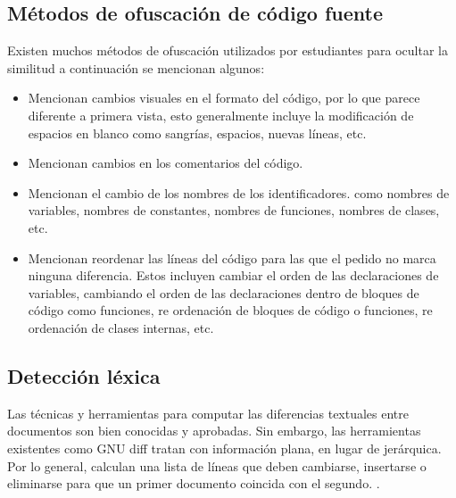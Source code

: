 \subsection{Métodos de ofuscación de código fuente}
Existen muchos métodos de ofuscación utilizados por estudiantes para ocultar la similitud a continuación se mencionan algunos:
\begin{itemize}
    \item \cite{article3} Mencionan cambios visuales en el formato del código, por lo que parece diferente a primera vista, esto generalmente incluye la modificación de espacios en blanco como sangrías, espacios, nuevas líneas, etc.
    \item \cite{article3} Mencionan cambios en los comentarios del código.
    \item \cite{donaldson1981plagiarism} Mencionan el cambio de los nombres de los identificadores. como nombres de variables, nombres de constantes, nombres de funciones, nombres de clases, etc.
    \item \cite{donaldson1981plagiarism} Mencionan reordenar las líneas del código para las que el pedido no marca ninguna diferencia. Estos incluyen cambiar el orden de las declaraciones de variables, cambiando el orden de las declaraciones dentro de bloques de código como funciones, re ordenación de bloques de código o funciones, re ordenación de clases internas, etc.
\end{itemize}
\subsection{Detección léxica}
Las técnicas y herramientas para computar las diferencias textuales entre documentos son bien conocidas y aprobadas. Sin embargo, las herramientas existentes como GNU diff tratan con información plana, en lugar de jerárquica. Por lo general, calculan una lista de líneas que deben cambiarse, insertarse o eliminarse para que un primer documento coincida con el segundo. \cite{ChangeDistiller}.
